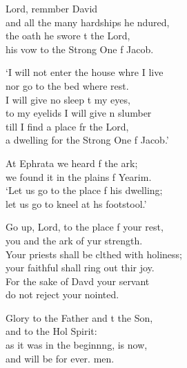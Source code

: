 \settowidth{\versewidth}{Your priests shall be clothed with holiness; *}
\begin{psalmverse}%
  \begin{patverse}
 Lord, remmber David\Med\\
    and all the many hardships he ndured,\\
the oath he swore t the Lord,\Med\\
    his vow to the Strong One f Jacob.

‘I will not enter the house whre I live\Med\\
    nor go to the bed where  rest.\\
I will give no sleep t my eyes,\Med\\
    to my eyelids I will give n slumber\\
till I find a place fr the Lord,\Med\\
    a dwelling for the Strong One f Jacob.’

At Ephrata we heard f the ark;\Med\\
    we found it in the plains f Yearim.\\
‘Let us go to the place f his dwelling;\Med\\
    let us go to kneel at h\pointup{\i}s footstool.’

Go up, Lord, to the place f your rest,\Med\\
    you and the ark of yur strength.\\
Your priests shall be clthed with holiness;\Med\\
    your faithful shall ring out thir joy.\\
For the sake of Dav\pointup{\i}d your servant\Med\\
    do not reject your nointed.

Glory to the Father and t the Son,\Med\\
    and to the Hol Spirit:\\
as it was in the beginn\pointup{\i}ng, is now,\Med\\
    and will be for ever. men.
  \end{patverse}
\end{psalmverse}

